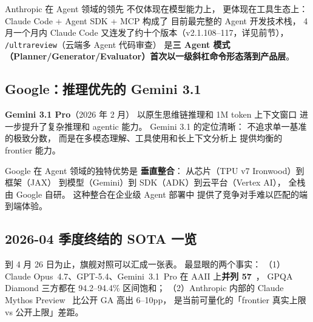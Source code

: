 Anthropic 在 Agent 领域的领先
不仅体现在模型能力上，
更体现在工具生态上：
Claude Code + Agent SDK + MCP 构成了
目前最完整的 Agent 开发技术栈，
4 月一个月内 Claude Code 又连发了约十个版本（v2.1.108--117，详见前节），
\texttt{/ultrareview}（云端多 Agent 代码审查）
是\textbf{三 Agent 模式（Planner/Generator/Evaluator）首次以一级斜杠命令形态落到产品层}。

\subsection{Google：推理优先的 Gemini 3.1}

\textbf{Gemini 3.1 Pro}（2026 年 2 月）
以原生思维链推理和 1M token 上下文窗口
进一步提升了复杂推理和 agentic 能力。
Gemini 3.1 的定位清晰：
不追求单一基准的极致分数，
而是在多模态理解、工具使用和长上下文分析上
提供均衡的 frontier 能力。

Google 在 Agent 领域的独特优势是
\textbf{垂直整合}：
从芯片（TPU v7 Ironwood）到框架（JAX）
到模型（Gemini）到 SDK（ADK）到云平台（Vertex AI），
全栈由 Google 自研。
这种整合在企业级 Agent 部署中
提供了竞争对手难以匹配的端到端体验。

\subsection{2026-04 季度终结的 SOTA 一览}

到 4 月 26 日为止，旗舰对照可以汇成一张表。
最显眼的两个事实：
（1）Claude Opus~4.7、GPT-5.4、Gemini~3.1~Pro 在 AAII 上\textbf{并列 57}~\cite{datalearner2026aaii}，
GPQA Diamond 三方都在 94.2--94.4\% 区间饱和；
（2）Anthropic 内部的 Claude Mythos Preview~\cite{anthropicmythos}
比公开 GA 高出 6--10pp，
是当前可量化的「frontier 真实上限 vs 公开上限」差距。

